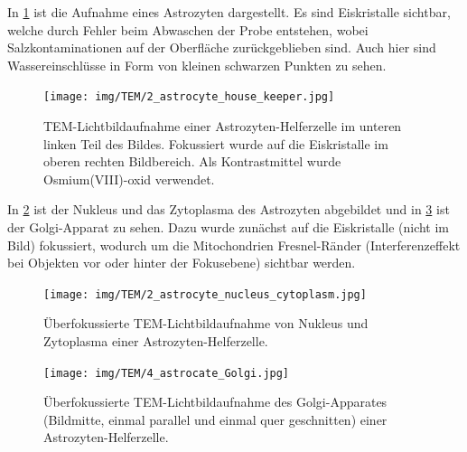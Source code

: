 In \cref{fig:tem:ahk} ist die Aufnahme eines Astrozyten dargestellt.
Es sind Eiskristalle sichtbar, welche durch Fehler beim Abwaschen der Probe entstehen, wobei Salzkontaminationen auf der Oberfläche zurückgeblieben sind.
Auch hier sind Wassereinschlüsse in Form von kleinen schwarzen Punkten zu sehen.

\begin{figure}[!ht]
    \centering
    \texttt{[image: img/TEM/2\_astrocyte\_house\_keeper.jpg]}
    \caption{TEM-Lichtbildaufnahme einer Astrozyten-Helferzelle im unteren linken Teil des Bildes. Fokussiert wurde auf die Eiskristalle im oberen rechten Bildbereich. Als Kontrastmittel wurde Osmium(VIII)-oxid verwendet.}
    \label{fig:tem:ahk}
\end{figure}

In \cref{fig:tem:anc} ist der Nukleus und das Zytoplasma des Astrozyten abgebildet und in \cref{fig:tem:golgi} ist der Golgi-Apparat zu sehen.
Dazu wurde zunächst auf die Eiskristalle (nicht im Bild) fokussiert, wodurch um die Mitochondrien Fresnel-Ränder (Interferenzeffekt bei Objekten vor oder hinter der Fokusebene) sichtbar werden.

\begin{figure}[!ht]
    \centering
    \texttt{[image: img/TEM/2\_astrocyte\_nucleus\_cytoplasm.jpg]}
    \caption{Überfokussierte TEM-Lichtbildaufnahme von Nukleus und Zytoplasma einer Astrozyten-Helferzelle.}
    \label{fig:tem:anc}
\end{figure}

\begin{figure}[!ht]
    \centering
    \texttt{[image: img/TEM/4\_astrocate\_Golgi.jpg]}
    \caption{Überfokussierte TEM-Lichtbildaufnahme des Golgi-Apparates (Bildmitte, einmal parallel und einmal quer geschnitten) einer Astrozyten-Helferzelle. }
    \label{fig:tem:golgi}
\end{figure}




